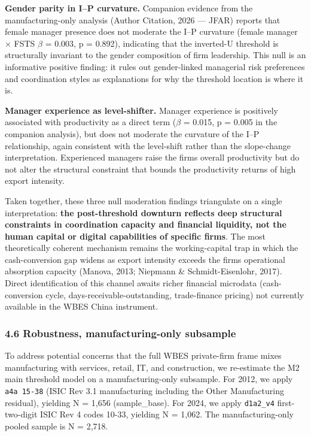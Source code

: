 \documentclass[12pt,a4paper]{article}
\begin{document}
\textbf{Gender parity in I--P curvature.} Companion evidence from the
manufacturing-only analysis (Author Citation, 2026 --- JFAR) reports
that female manager presence does not moderate the I--P curvature
(female manager \(\times\) FSTS \(\beta\) = 0.003, p = 0.892),
indicating that the inverted-U threshold is structurally invariant to
the gender composition of firm leadership. This null is an informative
positive finding: it rules out gender-linked managerial risk preferences
and coordination styles as explanations for why the threshold location
is where it is.

\textbf{Manager experience as level-shifter.} Manager experience is
positively associated with productivity as a direct term (\(\beta\) =
0.015, p = 0.005 in the companion analysis), but does not moderate the
curvature of the I--P relationship, again consistent with the
level-shift rather than the slope-change interpretation. Experienced
managers raise the firm\textquotesingle s overall productivity but do
not alter the structural constraint that bounds the productivity returns
of high export intensity.

Taken together, these three null moderation findings triangulate on a
single interpretation: \textbf{the post-threshold downturn reflects deep
structural constraints in coordination capacity and financial liquidity,
not the human capital or digital capabilities of specific firms}. The
most theoretically coherent mechanism remains the working-capital trap
in which the cash-conversion gap widens as export intensity exceeds the
firm\textquotesingle s operational absorption capacity (Manova, 2013;
Niepmann \& Schmidt-Eisenlohr, 2017). Direct identification of this
channel awaits richer financial microdata (cash-conversion cycle,
days-receivable-outstanding, trade-finance pricing) not currently
available in the WBES China instrument.

\hypertarget{46-robustness-manufacturing-only-subsample}{%
\subsubsection{4.6 Robustness, manufacturing-only
subsample}\label{46-robustness-manufacturing-only-subsample}}

To address potential concerns that the full WBES private-firm frame
mixes manufacturing with services, retail, IT, and construction, we
re-estimate the M2 main threshold model on a manufacturing-only
subsample. For 2012, we apply \texttt{a4a\ 15-38} (ISIC Rev 3.1
manufacturing including the Other Manufacturing residual), yielding N =
1,656 (sample\_base). For 2024, we apply \texttt{d1a2\_v4}
first-two-digit ISIC Rev 4 codes 10-33, yielding N = 1,062. The
manufacturing-only pooled sample is N = 2,718.
\end{document}
